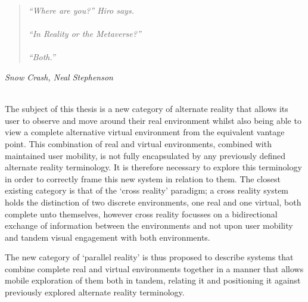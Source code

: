 \begin{quote}
\textit{``Where are you?'' Hiro says.
\\
\\
``In Reality or the Metaverse?''
\\
\\
``Both.''}
\end{quote}
\hfill \textit{Snow Crash, Neal Stephenson}
\\
\\


\label{chapter-background}



The subject of this thesis is a new category of alternate reality that allows its user to observe and move around their real environment whilst also being able to view a complete alternative virtual environment from the equivalent vantage point. This combination of real and virtual environments, combined with maintained user mobility, is not fully encapsulated by any previously defined alternate reality terminology. It is therefore necessary to explore this terminology in order to correctly frame this new system in relation to them. The closest existing category is that of the `cross reality' paradigm; a cross reality system holds the distinction of two discrete environments, one real and one virtual, both complete unto themselves, however cross reality focusses on a bidirectional exchange of information between the environments and not upon user mobility and tandem visual engagement with both environments.

The new category of `parallel reality' is thus proposed to describe systems that combine complete real and virtual environments together in a manner that allows mobile exploration of them both in tandem, relating it and positioning it against previously explored alternate reality terminology.


